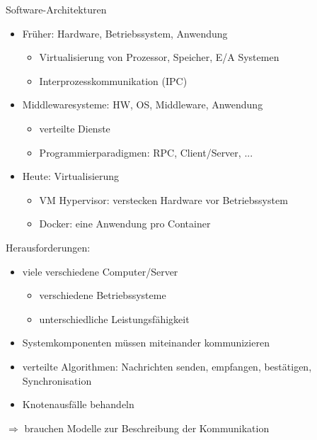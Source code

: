 \documentclass[10pt]{article}
\begin{document}
Software-Architekturen
\begin{itemize}
  \item Früher: Hardware, Betriebssystem, Anwendung
        \begin{itemize}
          \item Virtualisierung von Prozessor, Speicher, E/A Systemen
          \item Interprozesskommunikation (IPC)
        \end{itemize}
  \item Middlewaresysteme: HW, OS, Middleware, Anwendung
        \begin{itemize}
          \item verteilte Dienste
          \item Programmierparadigmen: RPC, Client/Server, ...
        \end{itemize}
  \item Heute: Virtualisierung
        \begin{itemize}
          \item VM Hypervisor: verstecken Hardware vor Betriebssystem
          \item Docker: eine Anwendung pro Container
        \end{itemize}
\end{itemize}


Herausforderungen:
\begin{itemize}
  \item viele verschiedene Computer/Server
        \begin{itemize}
          \item verschiedene Betriebssysteme
          \item unterschiedliche Leistungsfähigkeit
        \end{itemize}
  \item Systemkomponenten müssen miteinander kommunizieren
  \item verteilte Algorithmen: Nachrichten senden, empfangen, bestätigen, Synchronisation
  \item Knotenausfälle behandeln
\end{itemize}
$\Rightarrow$ brauchen Modelle zur Beschreibung der Kommunikation
\end{document}
